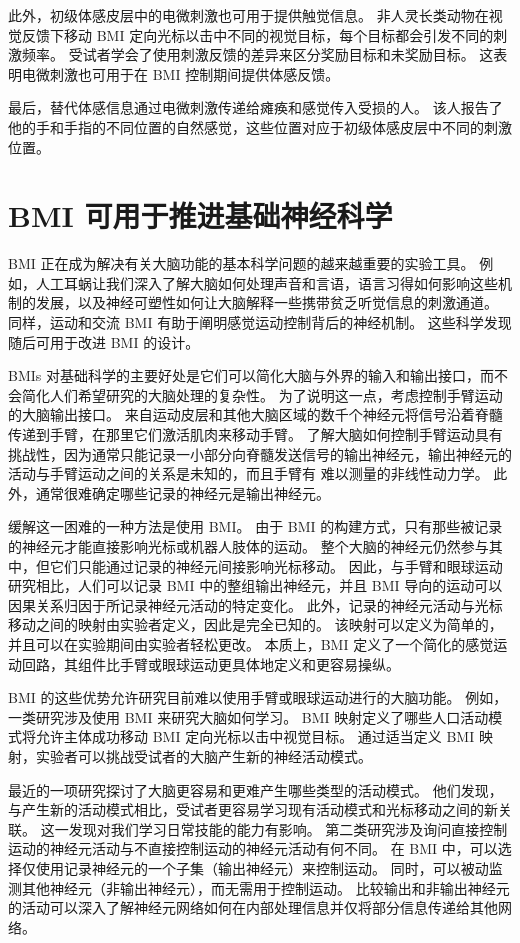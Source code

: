 此外，初级体感皮层中的电微刺激也可用于提供触觉信息。
非人灵长类动物在视觉反馈下移动 BMI 定向光标以击中不同的视觉目标，每个目标都会引发不同的刺激频率。 
受试者学会了使用刺激反馈的差异来区分奖励目标和未奖励目标。
这表明电微刺激也可用于在 BMI 控制期间提供体感反馈。


最后，替代体感信息通过电微刺激传递给瘫痪和感觉传入受损的人。
该人报告了他的手和手指的不同位置的自然感觉，这些位置对应于初级体感皮层中不同的刺激位置。


\section{BMI 可用于推进基础神经科学}

BMI 正在成为解决有关大脑功能的基本科学问题的越来越重要的实验工具。
例如，人工耳蜗让我们深入了解大脑如何处理声音和言语，语言习得如何影响这些机制的发展，以及神经可塑性如何让大脑解释一些携带贫乏听觉信息的刺激通道。
同样，运动和交流 BMI 有助于阐明感觉运动控制背后的神经机制。
这些科学发现随后可用于改进 BMI 的设计。


BMIs 对基础科学的主要好处是它们可以简化大脑与外界的输入和输出接口，而不会简化人们希望研究的大脑处理的复杂性。
为了说明这一点，考虑控制手臂运动的大脑输出接口。
来自运动皮层和其他大脑区域的数千个神经元将信号沿着脊髓传递到手臂，在那里它们激活肌肉来移动手臂。
了解大脑如何控制手臂运动具有挑战性，因为通常只能记录一小部分向脊髓发送信号的输出神经元，输出神经元的活动与手臂运动之间的关系是未知的，而且手臂有 难以测量的非线性动力学。
此外，通常很难确定哪些记录的神经元是输出神经元。


缓解这一困难的一种方法是使用 BMI。
由于 BMI 的构建方式，只有那些被记录的神经元才能直接影响光标或机器人肢体的运动。
整个大脑的神经元仍然参与其中，但它们只能通过记录的神经元间接影响光标移动。
因此，与手臂和眼球运动研究相比，人们可以记录 BMI 中的整组输出神经元，并且 BMI 导向的运动可以因果关系归因于所记录神经元活动的特定变化。
此外，记录的神经元活动与光标移动之间的映射由实验者定义，因此是完全已知的。 该映射可以定义为简单的，并且可以在实验期间由实验者轻松更改。
本质上，BMI 定义了一个简化的感觉运动回路，其组件比手臂或眼球运动更具体地定义和更容易操纵。


BMI 的这些优势允许研究目前难以使用手臂或眼球运动进行的大脑功能。
例如，一类研究涉及使用 BMI 来研究大脑如何学习。 
BMI 映射定义了哪些人口活动模式将允许主体成功移动 BMI 定向光标以击中视觉目标。
通过适当定义 BMI 映射，实验者可以挑战受试者的大脑产生新的神经活动模式。


最近的一项研究探讨了大脑更容易和更难产生哪些类型的活动模式。
他们发现，与产生新的活动模式相比，受试者更容易学习现有活动模式和光标移动之间的新关联。
这一发现对我们学习日常技能的能力有影响。
第二类研究涉及询问直接控制运动的神经元活动与不直接控制运动的神经元活动有何不同。
在 BMI 中，可以选择仅使用记录神经元的一个子集（输出神经元）来控制运动。
同时，可以被动监测其他神经元（非输出神经元），而无需用于控制运动。
比较输出和非输出神经元的活动可以深入了解神经元网络如何在内部处理信息并仅将部分信息传递给其他网络。


